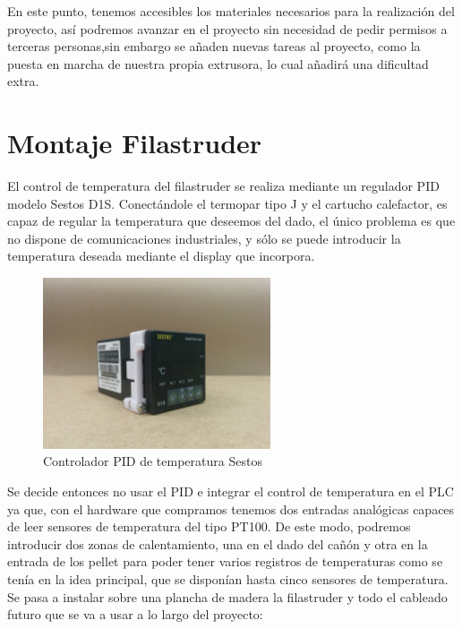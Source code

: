 En este punto, tenemos accesibles los materiales necesarios para la realización del proyecto,  así podremos avanzar en el proyecto sin necesidad de pedir permisos a terceras personas,sin embargo se añaden nuevas tareas al proyecto, como la puesta en marcha de nuestra propia extrusora, lo cual añadirá una dificultad extra.\\

\section{Montaje Filastruder}
\label{sec:filastruder}

El control de temperatura del filastruder se realiza mediante un regulador PID modelo Sestos D1S. Conectándole el termopar tipo J y el cartucho calefactor, es capaz de regular la temperatura que deseemos del dado, el único problema es que no dispone de comunicaciones industriales, y sólo se puede introducir la temperatura deseada mediante el display que incorpora.
   	\begin{figure}[H]
            \centering
            \includegraphics[width=0.6\textwidth]{images/filaextruder/IMG_20150814_123957.jpg}
            \caption{Controlador PID de temperatura Sestos}
            \label{fig:hardware_sestos}
    \end{figure}

Se decide entonces no usar el PID e integrar el control de temperatura en el PLC ya que, con el hardware que compramos tenemos dos entradas analógicas capaces de leer sensores de temperatura del tipo PT100. De este modo, podremos introducir dos zonas de calentamiento, una en el dado del cañón y otra en la entrada de los pellet para poder tener varios registros de temperaturas como se tenía en la idea principal, que se disponían hasta cinco sensores de temperatura.\\

Se pasa a instalar sobre una plancha de madera la filastruder y todo el cableado futuro que se va a usar a lo largo del proyecto:\\

